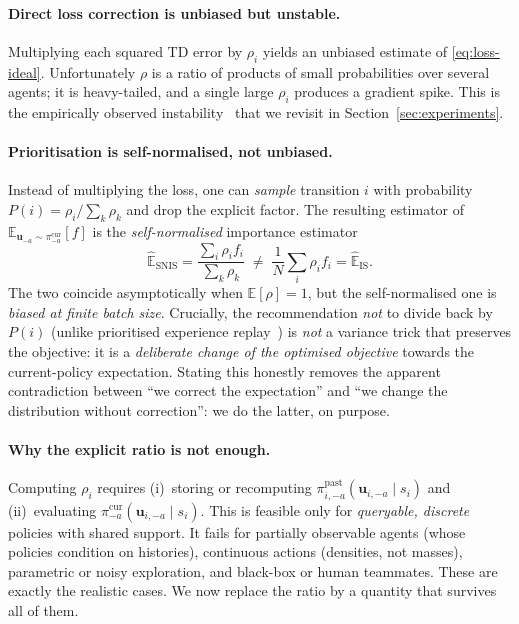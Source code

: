 \documentclass[sigconf]{aamas}
\newcommand{\uma}{\mathbf{u}_{-a}}
\newcommand{\umai}{\mathbf{u}_{i,-a}}
\newcommand{\picur}{\pi^{\mathrm{cur}}_{-a}}
\newcommand{\pipasti}{\pi^{\mathrm{past}}_{i,-a}}
\begin{document}
\paragraph{Direct loss correction is unbiased but unstable.}
Multiplying each squared TD error by $\rho_i$ yields an unbiased estimate of
\eqref{eq:loss-ideal}. Unfortunately $\rho$ is a ratio of products of small
probabilities over several agents; it is heavy-tailed, and a single large
$\rho_i$ produces a gradient spike. This is the empirically observed
instability~\cite{foerster2017stabilising} that we revisit in
Section~\ref{sec:experiments}.

\paragraph{Prioritisation is self-normalised, not unbiased.}
Instead of multiplying the loss, one can \emph{sample} transition $i$ with
probability $P(i)=\rho_i/\sum_k\rho_k$ and drop the explicit factor. The
resulting estimator of $\mathbb{E}_{\uma\sim\picur}[f]$ is the
\emph{self-normalised} importance estimator
\begin{equation}
\label{eq:snis}
\widehat{\mathbb{E}}_{\mathrm{SNIS}}=\frac{\sum_i\rho_i f_i}{\sum_k\rho_k}
\;\neq\;\frac1N\sum_i\rho_i f_i=\widehat{\mathbb{E}}_{\mathrm{IS}} .
\end{equation}
The two coincide asymptotically when $\mathbb{E}[\rho]=1$, but the
self-normalised one is \emph{biased at finite batch size}. Crucially, the
recommendation \emph{not} to divide back by $P(i)$ (unlike prioritised experience
replay~\cite{schaul2016prioritized}) is \emph{not} a variance trick that
preserves the objective: it is a \emph{deliberate change of the optimised
objective} towards the current-policy expectation. Stating this honestly removes
the apparent contradiction between ``we correct the expectation'' and ``we change
the distribution without correction'': we do the latter, on purpose.

\paragraph{Why the explicit ratio is not enough.}
Computing $\rho_i$ requires (i)~storing or recomputing $\pipasti(\umai\mid s_i)$
and (ii)~evaluating $\picur(\umai\mid s_i)$. This is feasible only for
\emph{queryable, discrete} policies with shared support. It fails for partially
observable agents (whose policies condition on histories), continuous actions
(densities, not masses), parametric or noisy exploration, and black-box or
human teammates. These are exactly the realistic cases. We now replace the ratio
by a quantity that survives all of them.
\end{document}
